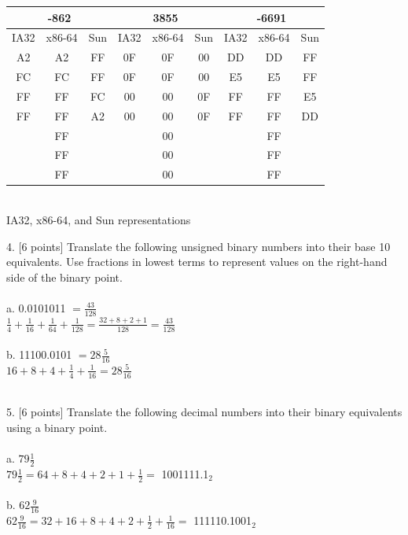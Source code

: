 \documentclass[12pt]{extarticle}
\begin{document}
\begin{center}
    \begin{tabular}{|c|c|c||c|c|c||c|c|c|}
    \hline
        \multicolumn{3}{|c||}{-862} &  \multicolumn{3}{|c||}{3855}  &  
        \multicolumn{3}{|c|}{-6691}  \\
    \hline
        IA32 & x86-64 & Sun & IA32 & x86-64 & Sun & IA32 & x86-64 & Sun\\
    \hline \hline
        A2 & A2 & FF & 0F & 0F & 00 & DD & DD & FF\\
        FC & FC & FF & 0F & 0F & 00 & E5 & E5 & FF\\
        FF & FF & FC & 00 & 00 & 0F & FF & FF & E5\\
        FF & FF & A2 & 00 & 00 & 0F & FF & FF & DD\\
           & FF &    &    & 00 &    &  & FF & \\
           & FF &    &    & 00 &    &  & FF & \\
           & FF &    &    & 00 &    &  & FF & \\
    \hline
    \end{tabular}\\
    IA32, x86-64, and Sun representations
\end{center}


\pagebreak



4. [6 points] Translate the following unsigned binary numbers into their base 10 equivalents. Use fractions in lowest terms to represent values on the right-hand side of the binary point.\\
\\
a. 0.0101011 $ = \frac{43}{128}$\\
$\frac{1}{4} +\frac{1}{16} +\frac{1}{64} + \frac{1}{128} = \frac{32+8+2+1}{128} = \frac{43}{128}$
\\
\\
b. 11100.0101 $= 28 \frac{5}{16}$\\
$16 + 8 + 4 + \frac{1}{4} + \frac{1}{16} = 28 \frac{5}{16}$
\\
\\


\pagebreak

5. [6 points] Translate the following decimal numbers into their binary equivalents using a binary point.
\\
\\
a. $79 \frac{1}{2}$\\
$79 \frac{1}{2} = 64 + 8 + 4 + 2 + 1 + \frac{1}{2} = $ 1001111.1$_2$
\\
\\
b. $62 \frac{9}{16}$\\
$62 \frac{9}{16} = 32 + 16 + 8 + 4 + 2 + \frac{1}{2} + \frac{1}{16} =$ 111110.1001$_2$
\\
\\
\end{document}
